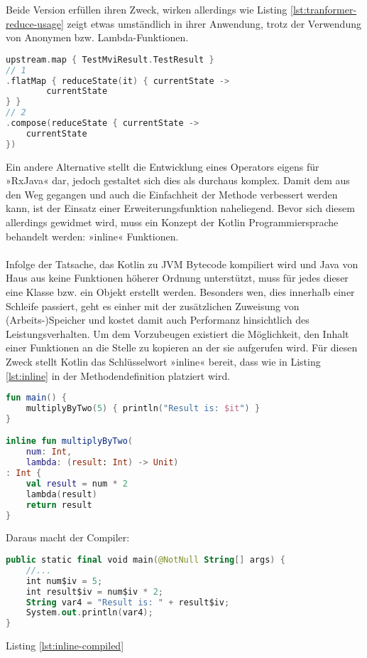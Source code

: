 Beide Version erfüllen ihren Zweck, wirken allerdings wie Listing 
\ref{lst:tranformer-reduce-usage}
zeigt etwas umständlich in ihrer Anwendung, trotz der Verwendung von Anonymen bzw. Lambda-Funktionen.
\begin{lstlisting}[caption={2. Versuch}, label={lst:versuch-2},language=Kotlin]
upstream.map { TestMviResult.TestResult }
// 1
.flatMap { reduceState(it) { currentState ->
		currentState
} }
// 2
.compose(reduceState { currentState ->
	currentState
})
\end{lstlisting}
\bigskip
Ein andere Alternative stellt die Entwicklung eines Operators eigens für »RxJava« dar, jedoch gestaltet sich dies als durchaus komplex.
\cite{rxjavaCustomOperator}
Damit dem aus den Weg gegangen und auch die Einfachheit der Methode verbessert werden kann, ist der Einsatz einer Erweiterungsfunktion naheliegend. Bevor sich diesem allerdings gewidmet wird, muss ein Konzept der Kotlin Programmiersprache behandelt werden: »inline« Funktionen.
\\\\
Infolge der Tatsache, das Kotlin zu JVM Bytecode kompiliert wird und Java von Haus aus keine Funktionen höherer Ordnung unterstützt, muss für jedes dieser eine Klasse bzw. ein Objekt erstellt werden. Besonders wen, dies innerhalb einer Schleife passiert, geht es einher mit der zusätzlichen Zuweisung von (Arbeits-)Speicher und kostet damit auch Performanz hinsichtlich des Leistungsverhalten. Um dem Vorzubeugen existiert die Möglichkeit, den Inhalt einer Funktionen an die Stelle zu kopieren an der sie aufgerufen wird. Für diesen Zweck stellt Kotlin das Schlüsselwort »inline« bereit, dass wie in Listing 
\ref{lst:inline}
in der Methodendefinition platziert wird.
\begin{lstlisting}[caption={inline}, label={lst:inline},language=Kotlin]
fun main() {
	multiplyByTwo(5) { println("Result is: $it") }
}

inline fun multiplyByTwo(
	num: Int, 
	lambda: (result: Int) -> Unit)
: Int {
	val result = num * 2
	lambda(result)
	return result
}
\end{lstlisting}
\bigskip
Daraus macht der Compiler:
\begin{lstlisting}[caption={inline kompiliert}, label={lst:inline-compiled},language=Kotlin]
public static final void main(@NotNull String[] args) {
	//...
	int num$iv = 5;
	int result$iv = num$iv * 2;
	String var4 = "Result is: " + result$iv;
	System.out.println(var4);
}
\end{lstlisting}
\bigskip
Listing
\ref{lst:inline-compiled}
